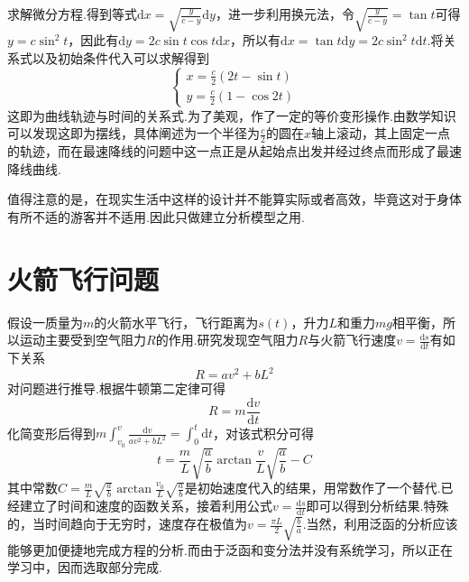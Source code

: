 \documentclass{article}
\begin{document}
	求解微分方程.得到等式$\mathrm{d}x=\sqrt{\frac{y}{c-y}}\mathrm{d}y$，进一步利用换元法，令$\sqrt{\frac{y}{c-y}}=\tan t$可得$y=c\sin^2 t$，因此有$\mathrm{d}y=2c\sin t\cos t\mathrm{d}x$，所以有$\mathrm{d}x=\tan t\mathrm{d}y=2c\sin^2t\mathrm{d}t$.将关系式以及初始条件代入可以求解得到
	\begin{equation}
	\begin{cases}
	x=\frac{c}{2}(2t-\sin t)\\
	y=\frac{c}{2}(1-\cos 2t)
	\end{cases}
	\end{equation}
	这即为曲线轨迹与时间的关系式.为了美观，作了一定的等价变形操作.由数学知识可以发现这即为摆线，具体阐述为一个半径为$\frac{c}{2}$的圆在$x$轴上滚动，其上固定一点的轨迹，而在最速降线的问题中这一点正是从起始点出发并经过终点而形成了最速降线曲线.
	
	值得注意的是，在现实生活中这样的设计并不能算实际或者高效，毕竟这对于身体有所不适的游客并不适用.因此只做建立分析模型之用.
	\section{火箭飞行问题}
	假设一质量为$m$的火箭水平飞行，飞行距离为$s(t)$，升力$L$和重力$mg$相平衡，所以运动主要受到空气阻力$R$的作用.研究发现空气阻力$R$与火箭飞行速度$v=\frac{\mathrm{d}s}{\mathrm{d}t}$有如下关系
	\begin{equation}
	R=av^2+bL^2
	\end{equation}
	对问题进行推导.根据牛顿第二定律可得
	\begin{equation}
	R=m\frac{\mathrm{d}v}{\mathrm{d}t}
	\end{equation}
	化简变形后得到$m\int_{v_0}^{v}\frac{\mathrm{d}v}{av^2+bL^2}=\int_{0}^{t}\mathrm{d}t$，对该式积分可得
	\begin{equation}
	t=\frac{m}{L}\sqrt{\frac{a}{b}}\arctan {\frac{v}{L}\sqrt{\frac{a}{b}}}-C
	\end{equation}
	其中常数$C=\frac{m}{L}\sqrt{\frac{a}{b}}\arctan {\frac{v_0}{L}\sqrt{\frac{a}{b}}}$是初始速度代入的结果，用常数作了一个替代.已经建立了时间和速度的函数关系，接着利用公式$v=\frac{\mathrm{d}s}{\mathrm{d}t}$即可以得到分析结果.特殊的，当时间趋向于无穷时，速度存在极值为$v=\frac{\pi L}{2}\sqrt{\frac{b}{a}}$.当然，利用泛函的分析应该能够更加便捷地完成方程的分析.而由于泛函和变分法并没有系统学习，所以正在学习中，因而选取部分完成.
\end{document}
